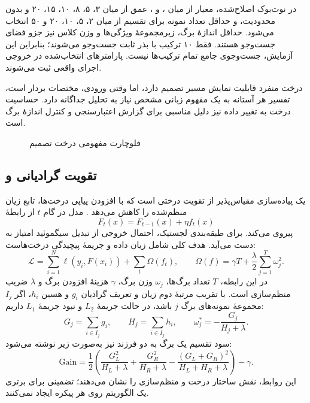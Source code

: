 در نوت‌بوک اصلاح‌شده، معیار از میان ،  و ، عمق از میان ۳، ۵، ۸، ۱۰، ۱۵، ۲۰ و بدون محدودیت، و حداقل تعداد نمونه برای تقسیم از میان ۲، ۵، ۱۰، ۲۰ و ۵۰ انتخاب می‌شود. حداقل اندازۀ برگ، زیرمجموعۀ ویژگی‌ها و وزن کلاس نیز جزو فضای جست‌وجو هستند. فقط ۱۰ ترکیب با بذر ثابت جست‌وجو می‌شوند؛ بنابراین این آزمایش، جست‌وجوی جامع تمام ترکیب‌ها نیست. پارامترهای انتخاب‌شده در خروجی اجرای واقعی ثبت می‌شوند.

درخت منفرد قابلیت نمایش مسیر تصمیم دارد، اما وقتی ورودی، مختصات بردار  است، تفسیر هر آستانه به یک مفهوم زبانی مشخص نیاز به تحلیل جداگانه دارد. حساسیت درخت به تغییر داده نیز دلیل مناسبی برای گزارش اعتبارسنجی و کنترل اندازۀ برگ است.
\begin{figure}[htbp]
\centering
\caption{فلوچارت مفهومی درخت تصمیم}
\label{fig:dt-flow}
\end{figure}

\subsection{تقویت گرادیانی و }
 یک پیاده‌سازی مقیاس‌پذیر از تقویت درختی است که با افزودن پیاپی درخت‌ها، تابع زیان منظم‌شده را کاهش می‌دهد \cite{ref159}. مدل در گام $t$ از رابطۀ
\begin{equation}
F_t(x)=F_{t-1}(x)+\eta f_t(x)
\end{equation}
پیروی می‌کند. برای طبقه‌بندی لجستیک، احتمال خروجی از تبدیل سیگموئید امتیاز به دست می‌آید. هدف کلی شامل زیان داده و جریمۀ پیچیدگی درخت‌هاست:
\begin{equation}
\mathcal L=\sum_{i=1}^{N}\ell(y_i,F(x_i))+\sum_t\Omega(f_t),\qquad
\Omega(f)=\gamma T+\frac\lambda2\sum_{j=1}^{T}\omega_j^2.
\end{equation}
در این رابطه، $T$ تعداد برگ‌ها، $\omega_j$ وزن برگ، $\gamma$ هزینۀ افزودن برگ و $\lambda$ ضریب منظم‌سازی است. با تقریب مرتبۀ دوم زیان و تعریف گرادیان $g_i$ و هسین $h_i$، اگر $I_j$ مجموعۀ نمونه‌های برگ $j$ باشد، در حالت جریمۀ $L_2$ و نبود جریمۀ $L_1$ داریم:
\begin{equation}
G_j=\sum_{i\in I_j}g_i,\qquad H_j=\sum_{i\in I_j}h_i,\qquad
\omega_j^*=-\frac{G_j}{H_j+\lambda}.
\end{equation}
سود تقسیم یک برگ به دو فرزند نیز به‌صورت زیر نوشته می‌شود:
\begin{equation}
\mathrm{Gain}=\frac12\left(\frac{G_L^2}{H_L+\lambda}+
\frac{G_R^2}{H_R+\lambda}-\frac{(G_L+G_R)^2}{H_L+H_R+\lambda}\right)-\gamma.
\end{equation}
این روابط، نقش ساختار درخت و منظم‌سازی را نشان می‌دهند؛ تضمینی برای برتری یک الگوریتم روی هر پیکره ایجاد نمی‌کنند.

